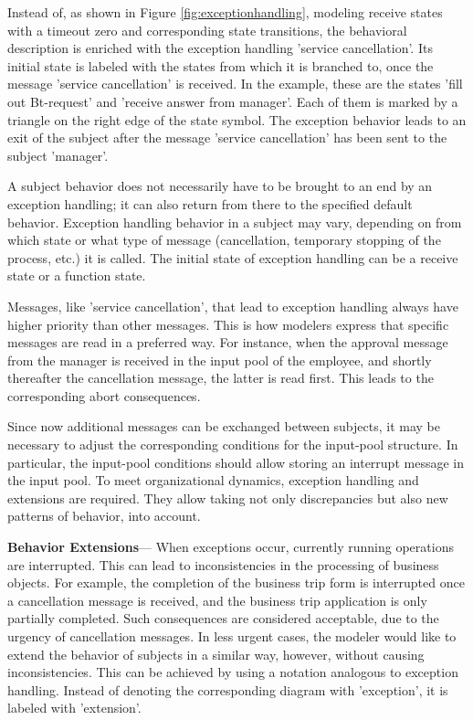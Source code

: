 Instead of, as shown in Figure \ref{fig:exceptionhandling}, modeling receive states with a timeout zero and corresponding state transitions, the behavioral description is enriched with the exception handling 'service cancellation'. Its initial state is labeled with the states from which it is branched to, once the message 'service cancellation' is received. In the example, these are the states 'fill out Bt-request' and 'receive answer from manager'. Each of them is marked by a triangle on the right edge of the state symbol. The exception behavior leads to an exit of the subject after the message 'service cancellation' has been sent to the subject 'manager'.

A subject behavior does not necessarily have to be brought to an end by an exception handling; it can also return from there to the specified default behavior. Exception handling behavior in a subject may vary, depending on from which state or what type of message (cancellation, temporary stopping of the process, etc.) it is called. The initial state of exception handling can be a receive state or a function state.

Messages, like 'service cancellation', that lead to exception handling always have higher priority than other messages. This is how modelers express that specific messages are read in a preferred way. For instance, when the approval message from the manager is received in the input pool of the employee, and shortly thereafter the cancellation message, the latter is read first. This leads to the corresponding abort consequences.

Since now additional messages can be exchanged between subjects, it may be necessary to adjust the corresponding conditions for the input-pool structure. In particular, the input-pool conditions should allow storing an interrupt message in the input pool. To meet organizational dynamics, exception handling and extensions are required. They allow taking not only discrepancies but also new patterns of behavior, into account.

\textbf{Behavior Extensions}---
When exceptions occur, currently running operations are interrupted. This can lead to inconsistencies in the processing of business objects. For example, the completion of the business trip form is interrupted once a cancellation message is received, and the business trip application is only partially completed. Such consequences are considered acceptable, due to the urgency of cancellation messages. In less urgent cases, the modeler would like to extend the behavior of subjects in a similar way, however, without causing inconsistencies. This can be achieved by using a notation analogous to exception handling. Instead of denoting the corresponding diagram with 'exception', it is labeled with 'extension'.

